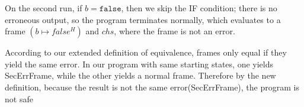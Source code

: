 \documentclass[11pt]{article}
\begin{document}
On the second run, if $b = \texttt{false}$, then we skip the IF condition; there is no erroneous output, so the program terminates normally, which evaluates to a frame $(b \mapsto false^H)$ and $chs$, where the frame is not an error.

According to our extended definition of equivalence, frames only equal if they yield the same error. In our program with same starting states, 
one yields SecErrFrame, while the other yields a normal frame. Therefore by the new definition, because the result is not the same error(SecErrFrame), the program is not safe
\end{document}

